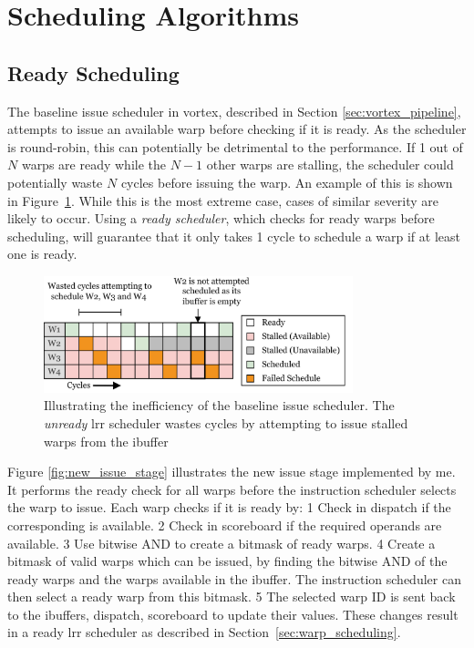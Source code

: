 \section{Scheduling Algorithms}

\subsection{Ready Scheduling} \label{sec:ready_scheduling}

The baseline issue scheduler in \Gls{vortex}, described in Section \ref{sec:vortex_pipeline}, attempts to issue an available warp before checking if it is ready. As the scheduler is round-robin, this can potentially be detrimental to the performance. If 1 out of $N$ warps are ready while the $N-1$ other warps are stalling, the scheduler could potentially waste $N$ cycles before issuing the warp. An example of this is shown in Figure~\ref{fig:unready_lrr}. While this is the most extreme case, cases of similar severity are likely to occur. Using a \textit{ready scheduler}, which checks for ready warps before scheduling, will guarantee that it only takes 1 cycle to schedule a warp if at least one is ready.

\begin{figure}
    \centering
    \includegraphics[width=0.8\textwidth]{figures/old_lrr_scheduler.png}
    \caption{Illustrating the inefficiency of the baseline issue scheduler. The \textit{unready} \acrshort{lrr} scheduler wastes cycles by attempting to issue stalled warps from the ibuffer}
    \label{fig:unready_lrr}
\end{figure}

Figure \ref{fig:new_issue_stage} illustrates the new issue stage implemented by me. It performs the ready check for all warps before the instruction scheduler selects the warp to issue. Each warp checks if it is ready by: \textcircled{\small{1}} Check in dispatch if the corresponding  is available. \textcircled{\small{2}} Check in scoreboard if the required operands are available. \textcircled{\small{3}} Use bitwise AND to create a bitmask of ready warps. \textcircled{\small{4}} Create a bitmask of valid warps which can be issued, by finding the bitwise AND of the ready warps and the warps available in the ibuffer. The instruction scheduler can then select a ready warp from this bitmask. \textcircled{\small{5}} The selected warp ID is sent back to the ibuffers, dispatch, scoreboard to update their values. These changes result in a ready \acrfull{lrr} scheduler as described in Section~\ref{sec:warp_scheduling}.

